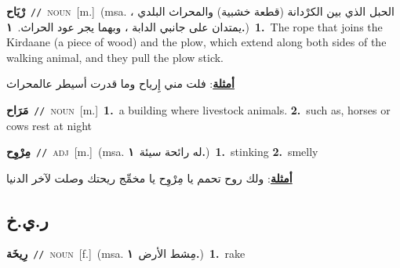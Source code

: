 \documentclass[10pt,a4paper,twoside]{article} %
\begin{document}
\begin{multicols}{2}
{\setlength\topsep{0pt}\textbf{\foreignlanguage{arabic}{رْيَاح}}\ {\color{gray}\texttt{//}\color{black}}\ \textsc{noun}\ [m.]\ \color{gray}(msa. \foreignlanguage{arabic}{الحبل الذي بين الكرْدانة (قطعة خشبية) والمحراث البلدي ، يمتدان على جانبي الدابة ، وبهما يجر عود الحراث.}~\foreignlanguage{arabic}{\textbf{١.}})\color{black}\ \textbf{1.}~The rope that joins the Kirdaane (a piece of wood) and the plow, which extend along both sides of the walking animal, and they pull the plow stick.\  \begin{flushright}\color{gray}\foreignlanguage{arabic}{\textbf{\underline{\foreignlanguage{arabic}{أمثلة}}}: فلت مني إِرياح وما قدرت أسيطر عالمحراث}\end{flushright}\color{black}} \vspace{2mm}

{\setlength\topsep{0pt}\textbf{\foreignlanguage{arabic}{مَرَاح}}\ {\color{gray}\texttt{//}\color{black}}\ \textsc{noun}\ [m.]\ \textbf{1.}~a building where livestock animals.  \textbf{2.}~such as, horses or cows rest at night\ } \vspace{2mm}

{\setlength\topsep{0pt}\textbf{\foreignlanguage{arabic}{مِرْوِح}}\ {\color{gray}\texttt{//}\color{black}}\ \textsc{adj}\ [m.]\ \color{gray}(msa. \foreignlanguage{arabic}{له رائحة سيئة}~\foreignlanguage{arabic}{\textbf{١.}})\color{black}\ \textbf{1.}~stinking  \textbf{2.}~smelly\  \begin{flushright}\color{gray}\foreignlanguage{arabic}{\textbf{\underline{\foreignlanguage{arabic}{أمثلة}}}: ولك روح تحمم يا مِرْوِح يا مخمِّج ريحتك وصلت لآخر الدنيا}\end{flushright}\color{black}} \vspace{2mm}

\vspace{-3mm}
\subsection*{\color{blue}\foreignlanguage{arabic}{ر.ي.خ}\color{blue}{}} 

{\setlength\topsep{0pt}\textbf{\foreignlanguage{arabic}{رِيخَة}}\ {\color{gray}\texttt{//}\color{black}}\ \textsc{noun}\ [f.]\ \color{gray}(msa. \foreignlanguage{arabic}{مِشط الأرض}~\foreignlanguage{arabic}{\textbf{١.}})\color{black}\ \textbf{1.}~rake\ } \vspace{2mm}


\end{multicols}
\end{document}
